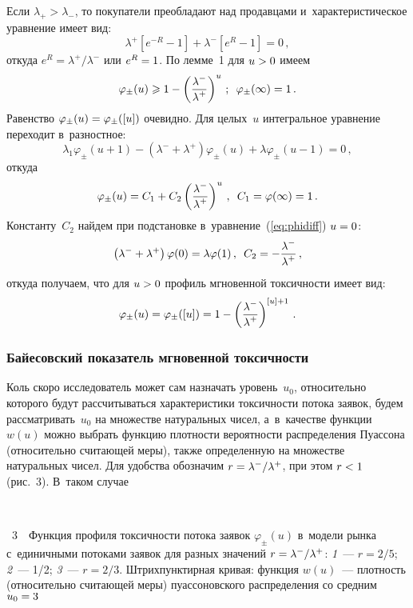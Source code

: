 \begin{multicols}{2}
Если $\lambda_+ > \lambda_-$, то покупатели преобладают над
продавцами и~характеристическое уравнение имеет вид:
$$
\lambda^+ \left[ e^{-R} - 1 \right] + \lambda^- \left[ e^{R} - 1 \right] = 0\,,
$$
откуда $e^R = {\lambda^+}/{\lambda^-}$ или $e^R \hm= 1$. По лемме~1
для $u \hm> 0$ имеем
$$
\varphi_{\pm}(u) \geqslant 1 - \left( \displaystyle\frac{\displaystyle \lambda^-\mathstrut}{\displaystyle \lambda^+\mathstrut} \right)^ {u}\,;\enskip
\varphi_{\pm}(\infty) = 1\,.
$$
Равенство $\varphi_{\pm}(u) \hm= \varphi_{\pm}([u])$ очевидно. Для целых~$u$
интегральное уравнение переходит в~разностное:
\begin{equation}
\lambda_1 \varphi_{\pm}(u + 1) - \left(\lambda^- + \lambda^+\right) \varphi_{\pm}(u)
+ \lambda \varphi_{\pm}(u - 1) = 0\,,
\label{eq:phidiff}
\end{equation}
откуда
$$
\varphi_{\pm}(u) = C_1 + C_2 \left (
\fr{\lambda^-}{\lambda^+} \right )^u\,,\enskip C_1 \hm= \varphi(\infty) = 1\,.
$$
Константу~$C_2$ найдем при подстановке в~уравнение~(\ref{eq:phidiff}) $u \hm= 0$:
$$
\left( \lambda^- + \lambda^+ \right) \varphi(0) = \lambda \varphi(1)\,,\enskip
C_2 = -\displaystyle\frac{\displaystyle \lambda^-\mathstrut}{\displaystyle \lambda^+\mathstrut}\,,
$$
откуда получаем, что для $u \hm> 0$ профиль мгновенной токсичности имеет вид:
$$
\varphi_{\pm}(u) = \varphi_{\pm}([u]) = 1 -  \left( \displaystyle\frac{\displaystyle \lambda^-\mathstrut}{\displaystyle \lambda^+\mathstrut} \right)^{[u] + 1}\,.
$$

\subsubsection{Байесовский показатель мгновенной токсичности}



Коль скоро исследователь может сам назначать уровень~$u_0$,
относительно которого будут рассчитываться характеристики
токсичности потока заявок, будем рассматривать~$u_0$ на множестве
натуральных чисел, а~в~качестве функции $w(u)$ можно выбрать функцию
плотности вероятности распределения Пуассона (относительно считающей
меры), также определенную на множестве натуральных чисел.
Для удобства обозначим $r \hm= {\lambda^-}/{\lambda^+}$, при этом
$r \hm< 1$ (рис.~3). В~таком случае


\begin{center}  %
\vspace*{1pt}
 \mbox{%
 \epsfxsize=77.205mm
 }
\end{center}

\noindent
{{\figurename~3}\ \ \small{Функция профиля токсичности потока заявок $\varphi_{\pm}(u)$
в~модели рынка с~единичными потоками заявок для разных значений
$r \hm= {\lambda^-}/{\lambda^+}$: \textit{1}~--- $r=2/5$;
\textit{2}~--- 1/2; \textit{3}~--- $r=2/3$.
Штрихпунктирная кривая: функция $w(u)$~---
    плотность (относительно считающей меры) пуассоновского
    распределения со средним $u_0 \hm= 3$}}



\end{multicols}
